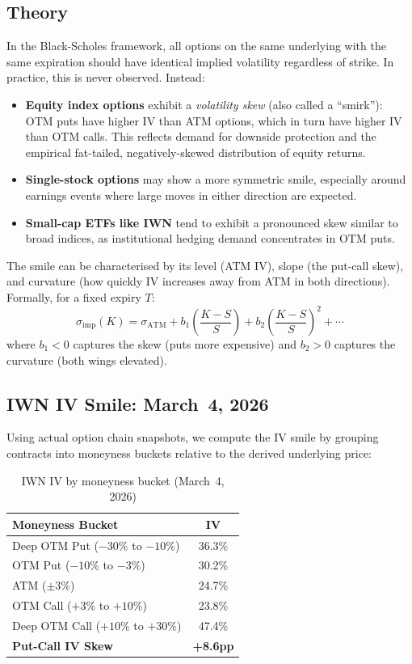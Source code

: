 \documentclass[11pt,letterpaper]{article}
\begin{document}
\subsection{Theory}

In the Black-Scholes framework, all options on the same underlying with the
same expiration should have identical implied volatility regardless of strike.
In practice, this is never observed. Instead:

\medskip
\begin{itemize}[itemsep=4pt]
  \item \textbf{Equity index options} exhibit a \textit{volatility skew}
        (also called a ``smirk''): OTM puts have higher IV than ATM options,
        which in turn have higher IV than OTM calls. This reflects demand for
        downside protection and the empirical fat-tailed, negatively-skewed
        distribution of equity returns.
  \item \textbf{Single-stock options} may show a more symmetric smile,
        especially around earnings events where large moves in either
        direction are expected.
  \item \textbf{Small-cap ETFs like IWN} tend to exhibit a pronounced skew
        similar to broad indices, as institutional hedging demand concentrates
        in OTM puts.
\end{itemize}

The smile can be characterised by its level (ATM IV), slope (the put-call
skew), and curvature (how quickly IV increases away from ATM in both
directions). Formally, for a fixed expiry $T$:
\[
  \sigma_{\mathrm{imp}}(K) = \sigma_{\mathrm{ATM}} + b_1\left(\frac{K - S}{S}\right)
  + b_2\left(\frac{K - S}{S}\right)^2 + \cdots
\]
where $b_1 < 0$ captures the skew (puts more expensive) and $b_2 > 0$
captures the curvature (both wings elevated).

\subsection{IWN IV Smile: March~4, 2026}

Using actual option chain snapshots, we compute the IV smile by grouping
contracts into moneyness buckets relative to the derived underlying price:

\begin{table}[H]
\centering
\caption{IWN IV by moneyness bucket (March~4, 2026)}
\begin{tabular}{lc}
\toprule
Moneyness Bucket & IV \\
\midrule
Deep OTM Put ($-30\%$ to $-10\%$) & 36.3\% \\
OTM Put ($-10\%$ to $-3\%$) & 30.2\% \\
ATM ($\pm3\%$) & 24.7\% \\
OTM Call ($+3\%$ to $+10\%$) & 23.8\% \\
Deep OTM Call ($+10\%$ to $+30\%$) & 47.4\% \\
\midrule
\textbf{Put-Call IV Skew} & \textbf{+8.6pp} \\
\bottomrule
\end{tabular}
\end{table}
\end{document}
